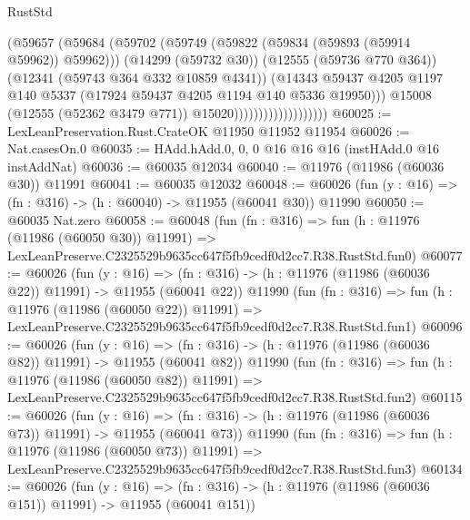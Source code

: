 \begin{lexlean}{RustStd}
\begin{coremodule}
                                      (@59657
                                        (@59684
                                          (@59702
                                            (@59749
                                              (@59822 (@59834 (@59893 (@59914 @59962)) @59962)))
                                            (@14299 (@59732 @30))
                                            (@12555 (@59736 @770 @364))
                                            (@12341 (@59743 @364 @332 @10859 @4341))
                                            (@14343
                                              @59437
                                              @4205
                                              @1197
                                              @140
                                              @5337
                                              (@17924 @59437 @4205 @1194 @140 @5336 @19950)))
                                          @15008
                                          (@12555 (@52362 @3479 @771))
                                          @15020)))))))))))))))))))
@60025 := LexLeanPreservation.Rust.CrateOK @11950 @11952 @11954
@60026 := Nat.casesOn.{0}
@60035 := HAdd.hAdd.{0, 0, 0} @16 @16 @16 (instHAdd.{0} @16 instAddNat)
@60036 := @60035 @12034
@60040 := @11976 (@11986 (@60036 @30)) @11991
@60041 := @60035 @12032
@60048 := @60026 (fun (y : @16) => (fn : @316) -> (h : @60040) -> @11955 (@60041 @30)) @11990
@60050 := @60035 Nat.zero
@60058 := @60048
    (fun (fn : @316) =>
    fun (h : @11976 (@11986 (@60050 @30)) @11991) =>
    LexLeanPreserve.C2325529b9635cc647f5fb9cedf0d2cc7.R38.RustStd.fun0)
@60077 := @60026
    (fun (y : @16) =>
    (fn : @316) -> (h : @11976 (@11986 (@60036 @22)) @11991) -> @11955 (@60041 @22))
    @11990
    (fun (fn : @316) =>
    fun (h : @11976 (@11986 (@60050 @22)) @11991) =>
    LexLeanPreserve.C2325529b9635cc647f5fb9cedf0d2cc7.R38.RustStd.fun1)
@60096 := @60026
    (fun (y : @16) =>
    (fn : @316) -> (h : @11976 (@11986 (@60036 @82)) @11991) -> @11955 (@60041 @82))
    @11990
    (fun (fn : @316) =>
    fun (h : @11976 (@11986 (@60050 @82)) @11991) =>
    LexLeanPreserve.C2325529b9635cc647f5fb9cedf0d2cc7.R38.RustStd.fun2)
@60115 := @60026
    (fun (y : @16) =>
    (fn : @316) -> (h : @11976 (@11986 (@60036 @73)) @11991) -> @11955 (@60041 @73))
    @11990
    (fun (fn : @316) =>
    fun (h : @11976 (@11986 (@60050 @73)) @11991) =>
    LexLeanPreserve.C2325529b9635cc647f5fb9cedf0d2cc7.R38.RustStd.fun3)
@60134 := @60026
    (fun (y : @16) =>
    (fn : @316) -> (h : @11976 (@11986 (@60036 @151)) @11991) -> @11955 (@60041 @151))

\end{coremodule}
\end{lexlean}
